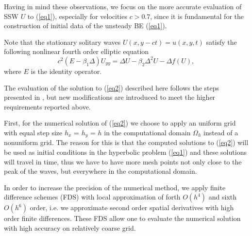 \documentclass[leqno,11pt]{book}
\newcommand{\rf}[1]{(\ref{#1})}
\begin{document}
Having in mind these  observations, we focus on the more accurate evaluation of SSW $U$ to \rf{eq1}, especially for  velocities $c > 0.7$, since it is fundamental for the construction of initial data of the unsteady BE \rf{eq1}. 

Note that the stationary solitary waves $U(x,y-ct)=u(x,y,t)$
 satisfy the following nonlinear fourth order elliptic equation
\begin{equation}\label{eq2}
c^2 (E-\beta_1 \Delta) U_{yy} = \Delta U -\beta_2 \Delta^2 U - \Delta f(U),
\end{equation}
where $E$ is the identity operator. 

The evaluation of the solution to \rf{eq2} described here follows the steps presented in \cite{Ch2012,chd-chr},
but new modifications are introduced to meet the higher requirements reported above.

First, for the numerical solution of \rf{eq2} we choose to apply an uniform grid with equal step size $h_x$ = $h_y$ = $h$ in the computational domain $\Omega_h$ instead of a nonuniform grid. The reason for this is that  
%
 the computed solutions to \rf{eq2} will be used as initial conditions in the hyperbolic problem \rf{eq1} and these solutions will travel in time, thus we have to have more mesh points not only close to the peak of the waves, but everywhere in   the  computational domain. 

In order to increase the precision of the numerical method, we apply finite difference schemes (FDS) with local approximation of forth $O(h^4)$ and sixth $O(h^6)$ order, i.e. we  approximate second order spatial derivatives with high order finite differences. These  FDS allow one to evaluate the numerical solution with high accuracy on relatively coarse grid. 
\end{document}
